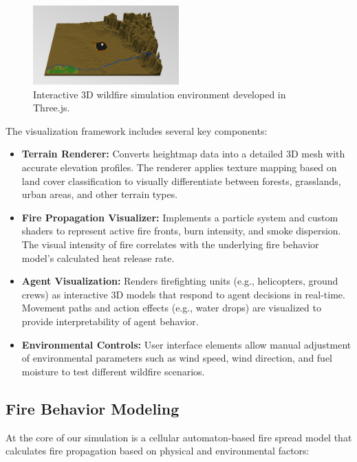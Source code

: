 \documentclass[conference]{IEEEtran}
\begin{document}
\begin{figure}[h!]
\centering
\includegraphics[width=0.5\textwidth]{sim.png}
\caption{Interactive 3D wildfire simulation environment developed in Three.js.}
\end{figure}

\noindent
The visualization framework includes several key components:

\begin{itemize}
    \item \textbf{Terrain Renderer:} Converts heightmap data into a detailed 3D mesh with accurate elevation profiles. The renderer applies texture mapping based on land cover classification to visually differentiate between forests, grasslands, urban areas, and other terrain types.
    
    \item \textbf{Fire Propagation Visualizer:} Implements a particle system and custom shaders to represent active fire fronts, burn intensity, and smoke dispersion. The visual intensity of fire correlates with the underlying fire behavior model's calculated heat release rate.
    
    \item \textbf{Agent Visualization:} Renders firefighting units (e.g., helicopters, ground crews) as interactive 3D models that respond to agent decisions in real-time. Movement paths and action effects (e.g., water drops) are visualized to provide interpretability of agent behavior.
    
    \item \textbf{Environmental Controls:} User interface elements allow manual adjustment of environmental parameters such as wind speed, wind direction, and fuel moisture to test different wildfire scenarios.
\end{itemize}

\subsection{Fire Behavior Modeling}
At the core of our simulation is a cellular automaton-based fire spread model that calculates fire propagation based on physical and environmental factors:
\end{document}
